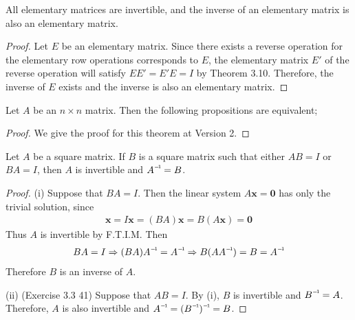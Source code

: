 \begin{theorem}
	All elementary matrices are invertible, and the inverse of an elementary matrix is also an elementary matrix.
\end{theorem}

\begin{proof}
	Let $E$ be an elementary matrix. Since there exists a reverse operation for the elementary row operations corresponds to $E$, the elementary matrix $E'$ of the reverse operation will satisfy $EE' = E'E = I$ by Theorem 3.10. Therefore, the inverse of $E$ exists and the inverse is also an elementary matrix.
\end{proof}

\begin{theorem}
	Let $A$ be an $n \times n$ matrix. Then the following propositions are equivalent;
\end{theorem}

\begin{proof}
	We give the proof for this theorem at Version 2.
\end{proof}

\begin{theorem}
	Let $A$ be a square matrix. If $B$ is a square matrix such that either $AB = I$ or $BA = I$, then $A$ is invertible and $\inv{A} = B$.
\end{theorem}

\begin{proof}
	(i) Suppose that $BA = I$. Then the linear system $A\textbf{x} = \textbf{0}$ has only the trivial solution, since \begin{align*}
	\textbf{x} = I\textbf{x} = (BA)\textbf{x} = B(A\textbf{x}) = \textbf{0}
	\end{align*}
	Thus $A$ is invertible by F.T.I.M. Then \begin{align*}
	BA = I \Rightarrow (BA)\inv{A} = \inv{A} \Rightarrow B(A\inv{A}) = B = \inv{A}
	\end{align*} Therefore $B$ is an inverse of $A$.
	
	\noindent (ii) (Exercise 3.3 41) Suppose that $AB = I$. By (i), $B$ is invertible and $\inv{B} = A$. Therefore, $A$ is also invertible and $\inv{A} = \inv{(\inv{B})} = B$.
\end{proof}

